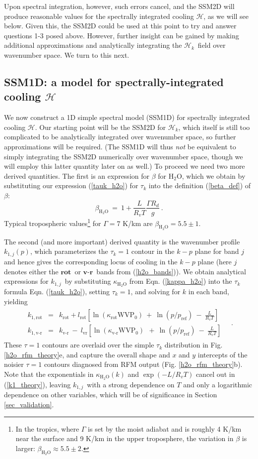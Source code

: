 \documentclass{ametsoc}
\newcommand{\beqn}{\begin{equation}}
\newcommand{\eeqn}{\end{equation}}
\newcommand{\beqa}{\begin{eqnarray}}
\newcommand{\eeqa}{\end{eqnarray}}
\newcommand{\eqnref}[1]{(\ref{#1})}
\newcommand{\Rd}{\ensuremath{R_d}}
\newcommand{\Rv}{\ensuremath{R_v}}
\newcommand{\htwo}{\ensuremath{\mathrm{H_2O}}}
\newcommand{\ch}{\ensuremath{\mathcal{H}}}
\newcommand{\chk}{\ensuremath{\ch_k}}
\newcommand{\tauk}{\ensuremath{\tau_k}}
\newcommand{\pref}{\ensuremath{p_{\mathrm{ref}}}}
\newcommand{\WVP}{\ensuremath{\mathrm{WVP}}}
\newcommand{\kapparot}{\ensuremath{\kappa_{\mathrm{rot}}}}
\newcommand{\kappavr}{\ensuremath{\kappa_{\text{v-r}}}}
\newcommand{\krot}{\ensuremath{k_\mathrm{rot}}}
\newcommand{\kvr}{\ensuremath{k_\text{v-r}}}
\newcommand{\konerot}{\ensuremath{k_{1,\mathrm{rot}}}}
\newcommand{\konevr}{\ensuremath{k_{1,\text{v-r}}}}
\newcommand{\konej}{\ensuremath{k_{1,j}}}
\newcommand{\lrot}{\ensuremath{l_\mathrm{rot}}}
\newcommand{\lvr}{\ensuremath{l_\mathrm{vr}}}
\newcommand{\vr}{\ensuremath{\textbf{v-r}}}
\newcommand{\rot}{\ensuremath{\textbf{rot}}}
\begin{document}
 Upon spectral  integration, however, such errors cancel, and the SSM2D will produce reasonable values for the spectrally integrated cooling \ch, as we will see below. Given this, the SSM2D could be used at this point to try and answer questions 1-3 posed above. However, further insight can be gained by making additional approximations and analytically integrating the \chk\ field over wavenumber space. We turn to this next.
 
 
\subsection{SSM1D: a model for spectrally-integrated cooling \ch} \label{sec_h2o_integrated}
 We now construct a 1D simple spectral model (SSM1D) for spectrally integrated cooling \ch. Our starting point will be the SSM2D for \chk, which itself is still  too complicated to be analytically integrated over wavenumber space, so further approximations will be required. (The SSM1D will thus  \emph{not} be equivalent to simply integrating the SSM2D numerically over wavenumber space, though we will employ this latter quantity later on as well.)  To proceed we need two more derived quantities. The first is an expression for $\beta$ for \htwo, which we obtain by substituting our expression \eqnref{tauk_h2o} for $\tauk$  into the definition \eqnref{beta_def} of $\beta$:
\beqn
	\beta_{\htwo} \ = \ 1+ \frac{L}{\Rv T}\frac{\Gamma \Rd}{g} \ .
	\label{beta_h2o}
\eeqn
Typical tropospheric values\footnote{In the tropics, where $\Gamma$ is set by the moist adiabat and is roughly  4 K/km near the surface and 9 K/km in the upper troposphere, the variation in $\beta$ is larger: $\beta_{\htwo}\approx5.5 \pm 2$.} for $\Gamma=7$ K/km are $\beta_{\htwo}=5.5 \pm 1$.

The second (and more important) derived quantity is the wavenumber profile $\konej(p)$, which parameterizes the $\tauk=1$ contour in the $k-p$ plane for band $j$ and hence gives the corresponding locus of cooling in the $k-p$ plane (here $j$ denotes either the \rot\ or \vr\  bands from \eqnref{h2o_bands}). We obtain analytical expressions for \konej\  by substituting $\kappa_{\htwo}$ from  Eqn.  \eqnref{kappa_h2o} into the $\tauk$ formula Eqn. \eqnref{tauk_h2o}, setting $\tauk=1$, and solving for $k$ in each band, yielding
 \beqa
	\begin{split}
	 	\konerot & = & \krot + \lrot\left[\ln(\kapparot\WVP_0) \    + \ \ln(p/\pref) \  - \ \frac{L}{\Rv T} \right]  \\ 
		\konevr  & = &  \kvr \ - \ \lvr\left[\ln(\kappavr\WVP_0) \ \  + \ \ln(p/\pref) \  - \ \frac{L}{\Rv T} \right]   
	\end{split} \quad .
	\label{k1_theory}
\eeqa
These $\tau=1$ contours  are overlaid over the simple $\tauk$ distribution in Fig. \ref{h2o_rfm_theory}e, and capture the overall shape and $x$ and $y$ intercepts of the noisier $\tau=1$ contours diagnosed from RFM output (Fig. \ref{h2o_rfm_theory}b). Note that the exponentials in $\kappa_{\htwo}(k)$ and $\exp(-L/\Rv T)$ cancel out in \eqnref{k1_theory}, leaving \konej\ with a strong dependence on $T$ and only a logarithmic dependence on other variables, which will be of significance in Section \ref{sec_validation}.
\end{document}
